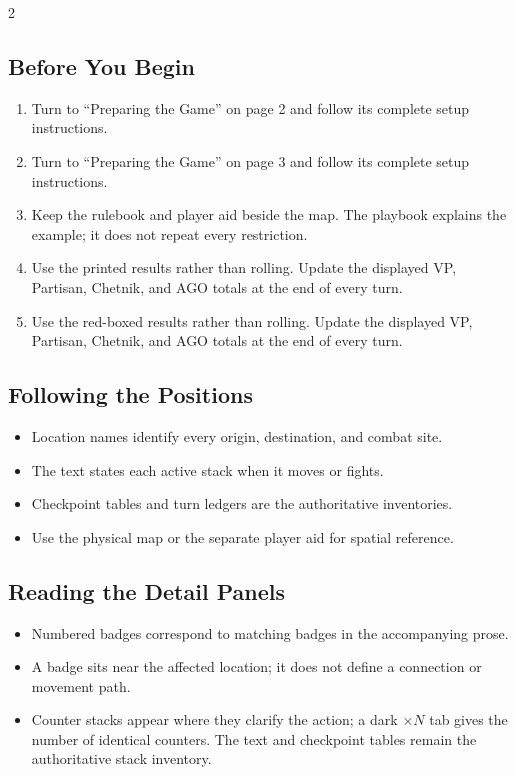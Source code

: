 \begin{multicols}{2}
\small
\subsection{Before You Begin}

\begin{enumerate}[leftmargin=1.45em,itemsep=3pt]
\iftextonly
  \item Turn to ``Preparing the Game'' on page 2 and follow its complete
    setup instructions.
\else
  \item Turn to ``Preparing the Game'' on page 3 and follow its complete
    setup instructions.
\fi
  \item Keep the rulebook and player aid beside the map. The playbook explains
    the example; it does not repeat every restriction.
\iftextonly
  \item Use the printed results rather than rolling. Update the displayed
    VP, Partisan, Chetnik, and AGO totals at the end of every turn.
\else
  \item Use the red-boxed results rather than rolling. Update the displayed
    VP, Partisan, Chetnik, and AGO totals at the end of every turn.
\fi
\end{enumerate}

\columnbreak
\iftextonly
\subsection{Following the Positions}

\begin{itemize}[leftmargin=1.2em,itemsep=3pt]
  \item Location names identify every origin, destination, and combat site.
  \item The text states each active stack when it moves or fights.
  \item Checkpoint tables and turn ledgers are the authoritative inventories.
  \item Use the physical map or the separate player aid for spatial reference.
\end{itemize}
\else
\subsection{Reading the Detail Panels}

\begin{itemize}[leftmargin=1.2em,itemsep=3pt]
  \item Numbered badges correspond to matching badges in the accompanying
    prose.
  \item A badge sits near the affected location; it does not define a
    connection or movement path.
  \item Counter stacks appear where they clarify the action; a dark
    \textbf{\(\times N\)} tab gives the number of identical counters.
    The text and checkpoint tables remain the authoritative stack inventory.
\end{itemize}
\fi
\end{multicols}

